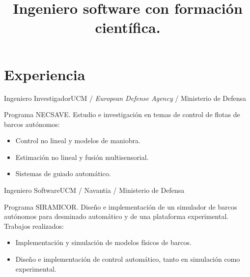 \documentclass[11pt,a4paper,sans]{moderncv}
\title{\normalsize Ingeniero software con formación científica.} %
\begin{document}
\maketitle

\section{Experiencia}

    {Ingeniero Investigador}{UCM / \emph{European Defense Agency} / Ministerio de Defensa}{}{}{
    Programa NECSAVE.\newline{}%
    Estudio e investigación en temas de control de flotas de barcos autónomos:%
    \begin{itemize}%
        \item Control no lineal y modelos de maniobra.
        \item Estimación no lineal y fusión multisensorial.
        \item Sistemas de guiado automático.
    \end{itemize}}

    {Ingeniero Software}{UCM / Navantia / Ministerio de Defensa}{}{}{
    Programa SIRAMICOR.\newline{}%
    Diseño e implementación de un simulador de barcos autónomos para desminado automático y de una
    plataforma experimental.\newline{}%
    Trabajos realizados:%
    \begin{itemize}%
        \item Implementación y simulación de modelos físicos de barcos.
        \item Diseño e implementación de control automático, tanto en simulación como experimental.
    \end{itemize}}
\end{document}

